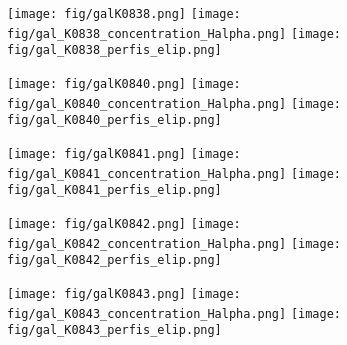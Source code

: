 \begin{figure}[!ht]
\begin{center}
\setcaptionmargin{1cm}
\texttt{[image: fig/galK0838.png]}
\texttt{[image: fig/gal\_K0838\_concentration\_Halpha.png]}
\texttt{[image: fig/gal\_K0838\_perfis\_elip.png]}
\end{center}
\end{figure}


\begin{figure}[!ht]
\begin{center}
\setcaptionmargin{1cm}
\texttt{[image: fig/galK0840.png]}
\texttt{[image: fig/gal\_K0840\_concentration\_Halpha.png]}
\texttt{[image: fig/gal\_K0840\_perfis\_elip.png]}
\end{center}
\end{figure}


\begin{figure}[!ht]
\begin{center}
\setcaptionmargin{1cm}
\texttt{[image: fig/galK0841.png]}
\texttt{[image: fig/gal\_K0841\_concentration\_Halpha.png]}
\texttt{[image: fig/gal\_K0841\_perfis\_elip.png]}
\end{center}
\end{figure}


\begin{figure}[!ht]
\begin{center}
\setcaptionmargin{1cm}
\texttt{[image: fig/galK0842.png]}
\texttt{[image: fig/gal\_K0842\_concentration\_Halpha.png]}
\texttt{[image: fig/gal\_K0842\_perfis\_elip.png]}
\end{center}
\end{figure}


\begin{figure}[!ht]
\begin{center}
\setcaptionmargin{1cm}
\texttt{[image: fig/galK0843.png]}
\texttt{[image: fig/gal\_K0843\_concentration\_Halpha.png]}
\texttt{[image: fig/gal\_K0843\_perfis\_elip.png]}
\end{center}
\end{figure}


